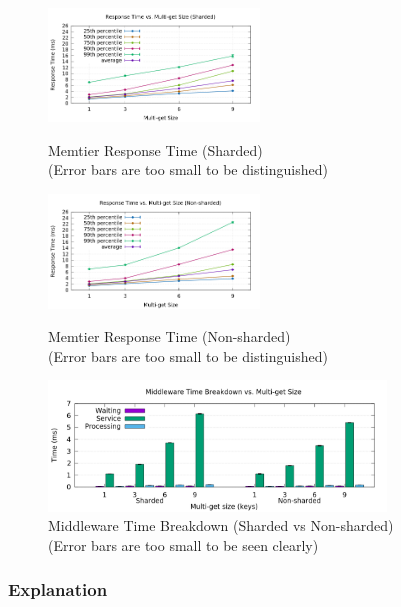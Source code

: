 \begin{figure}[!h]
\parbox{.5\linewidth}{
\centering
\includegraphics[width=0.5\textwidth]{img/5_1_responsetime.png}
\captionsetup{justification=centering}
\caption{\label{fig:5.1_responsetime}Memtier Response Time (Sharded)\\(Error bars are too small to be distinguished)}
}
\parbox{.5\linewidth}{
\centering
\includegraphics[width=0.5\textwidth]{img/5_2_responsetime.png}
\captionsetup{justification=centering}
\caption{\label{fig:5.2_responsetime}Memtier Response Time (Non-sharded)\\(Error bars are too small to be distinguished)}
}

\centering
\includegraphics[width=0.8\textwidth]{img/5_breakdown.png}
\captionsetup{justification=centering}
\caption{\label{fig:5_breakdown}Middleware Time Breakdown (Sharded vs Non-sharded)\\(Error bars are too small to be seen clearly)}
\end{figure}

\subsubsection{Explanation}

